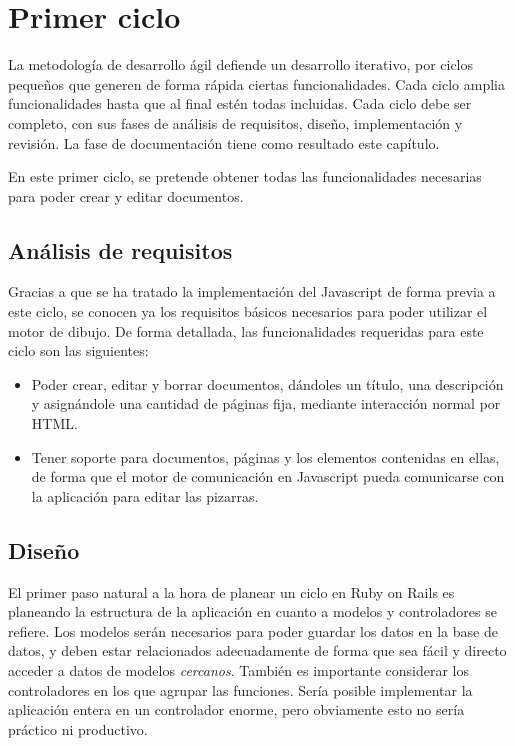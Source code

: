 \section{Primer ciclo} %
\label{sec:primer_ciclo}
La metodología de desarrollo ágil defiende un desarrollo iterativo, por ciclos pequeños que generen de forma rápida ciertas funcionalidades. Cada ciclo amplia funcionalidades hasta que al final estén todas incluidas. Cada ciclo debe ser completo, con sus fases de análisis de requisitos, diseño, implementación y revisión. La fase de documentación tiene como resultado este capítulo.

En este primer ciclo, se pretende obtener todas las funcionalidades necesarias para poder crear y editar documentos.

\subsection{Análisis de requisitos} %
\label{sub:análisis_de_requisitos}

Gracias a que se ha tratado la implementación del Javascript de forma previa a este ciclo, se conocen ya los requisitos básicos necesarios para poder utilizar el motor de dibujo. De forma detallada, las funcionalidades requeridas para este ciclo son las siguientes:

\begin{itemize}
  \item Poder crear, editar y borrar documentos, dándoles un título, una descripción y asignándole una cantidad de páginas fija, mediante interacción normal por HTML.
  \item Tener soporte para documentos, páginas y los elementos contenidas en ellas, de forma que el motor de comunicación en Javascript pueda comunicarse con la aplicación para editar las pizarras.
\end{itemize}


\subsection{Diseño} %
\label{sub:diseño}

El primer paso natural a la hora de planear un ciclo en Ruby on Rails es planeando la estructura de la aplicación en cuanto a modelos y controladores se refiere. Los modelos serán necesarios para poder guardar los datos en la base de datos, y deben estar relacionados adecuadamente de forma que sea fácil y directo acceder a datos de modelos \emph{cercanos}. También es importante considerar los controladores en los que agrupar las funciones. Sería posible implementar la aplicación entera en un controlador enorme, pero obviamente esto no sería práctico ni productivo.

